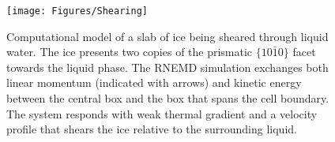 \begin{figure} 
\centering
\texttt{[image: Figures/Shearing]}
\caption{\label{fig:Shearing} Computational model of a slab of ice
  being sheared through liquid water.  The ice presents two copies of
  the prismatic $\{10\bar{1}0\}$ facet towards the liquid phase.  The
  RNEMD simulation exchanges both linear momentum (indicated with
  arrows) and kinetic energy between the central box and the box that
  spans the cell boundary.  The system responds with weak thermal
  gradient and a velocity profile that shears the ice relative to the
  surrounding liquid.}
\end{figure}


